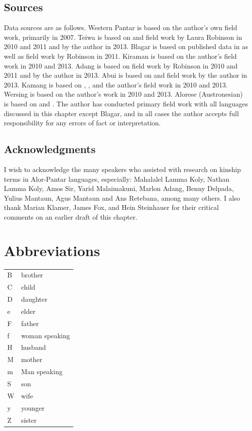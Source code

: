 \subsection*{Sources}
Data sources are as follows. Western Pantar is based on the author's own field work, primarily in 2007. Teiwa is based on \citet{Klamer2010} and field work by Laura Robinson in 2010 and 2011 and by the author in 2013. Blagar is based on published data in \citet{Steinhauer1993} as well as field work by Robinson in 2011. Kiraman is based on the author's field work in 2010 and 2013. Adang is based on field work by Robinson in 2010 and 2011 and by the author in 2013. Abui is based on \citet{KratochvilEtAl2008} and field work by the author in 2013. Kamang is based on \citet{Stokhof1977}, \citet{SchapperEtAl2011}, and the author's field work in 2010 and 2013. Wersing is based on the author's work in 2010 and 2013. Alorese (Austronesian) is based on \citet{Needham1956} and \citet{Barnes1973}. The author has conducted primary field work with all languages discussed in this chapter except Blagar, and in all cases the author accepts full responsibility for any errors of fact or interpretation.

\subsection*{Acknowledgments}
I wish to acknowledge the many speakers who assisted with research on kinship terms in Alor-Pantar languages, especially: Mahalalel Lamma Koly, Nathan Lamma Koly, Amos Sir, Yarid Malaimakuni, Marlon Adang, Benny Delpada, Yulius Mantaun, Agus Mantaun and Ans Retebana, among many others. I also thank Marian Klamer, James Fox, and Hein Steinhauer for their critical comments on an earlier draft of this chapter.


\section*{Abbreviations}


\begin{tabular}{ll}
B & brother\\
C & child\\
D & daughter\\
e & elder\\
F & father\\
f & woman  speaking\\
H & husband\\
M & mother\\
m & Man speaking\\
S & son\\
W & wife\\
y & younger\\
Z & sister\\
\end{tabular}

